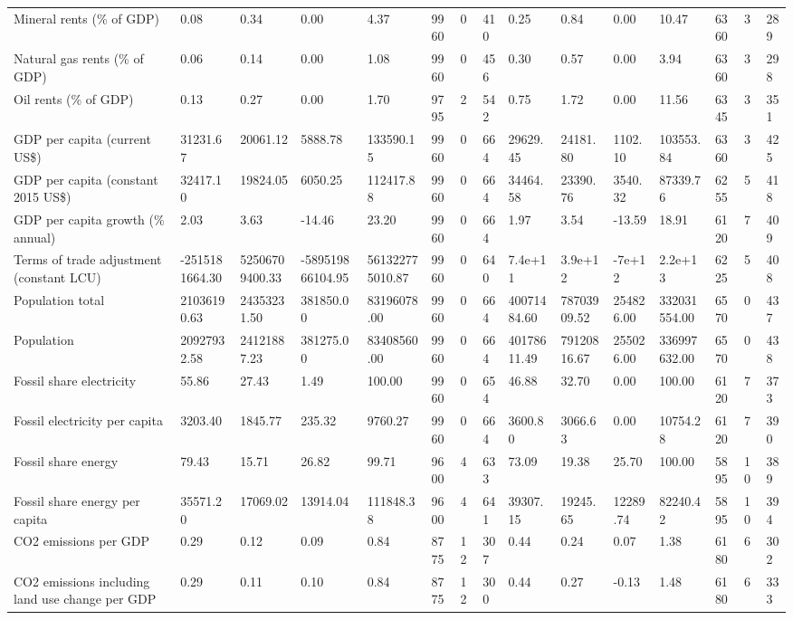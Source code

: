 \begin{longtable}{lllllllllllllll}
\addlinespace
Mineral rents (\% of GDP) & 0.08 & 0.34 & 0.00 & 4.37 & 9960 & 0 & 410 & 0.25 & 0.84 & 0.00 & 10.47 & 6360 & 3 & 289\\
Natural gas rents (\% of GDP) & 0.06 & 0.14 & 0.00 & 1.08 & 9960 & 0 & 456 & 0.30 & 0.57 & 0.00 & 3.94 & 6360 & 3 & 298\\
Oil rents (\% of GDP) & 0.13 & 0.27 & 0.00 & 1.70 & 9795 & 2 & 542 & 0.75 & 1.72 & 0.00 & 11.56 & 6345 & 3 & 351\\
GDP per capita (current US\$) & 31231.67 & 20061.12 & 5888.78 & 133590.15 & 9960 & 0 & 664 & 29629.45 & 24181.80 & 1102.10 & 103553.84 & 6360 & 3 & 425\\
GDP per capita (constant 2015 US\$) & 32417.10 & 19824.05 & 6050.25 & 112417.88 & 9960 & 0 & 664 & 34464.58 & 23390.76 & 3540.32 & 87339.76 & 6255 & 5 & 418\\
\addlinespace
GDP per capita growth (\% annual) & 2.03 & 3.63 & -14.46 & 23.20 & 9960 & 0 & 664 & 1.97 & 3.54 & -13.59 & 18.91 & 6120 & 7 & 409\\
Terms of trade adjustment (constant LCU) & -2515181664.30 & 52506709400.33 & -589519866104.95 & 561322775010.87 & 9960 & 0 & 640 & 7.4e+11 & 3.9e+12 & -7e+12 & 2.2e+13 & 6225 & 5 & 408\\
Population total & 21036190.63 & 24353231.50 & 381850.00 & 83196078.00 & 9960 & 0 & 664 & 40071484.60 & 78703909.52 & 254826.00 & 332031554.00 & 6570 & 0 & 437\\
Population & 20927932.58 & 24121887.23 & 381275.00 & 83408560.00 & 9960 & 0 & 664 & 40178611.49 & 79120816.67 & 255026.00 & 336997632.00 & 6570 & 0 & 438\\
Fossil share electricity & 55.86 & 27.43 & 1.49 & 100.00 & 9960 & 0 & 654 & 46.88 & 32.70 & 0.00 & 100.00 & 6120 & 7 & 373\\
\addlinespace
Fossil electricity per capita & 3203.40 & 1845.77 & 235.32 & 9760.27 & 9960 & 0 & 664 & 3600.80 & 3066.63 & 0.00 & 10754.28 & 6120 & 7 & 390\\
Fossil share energy & 79.43 & 15.71 & 26.82 & 99.71 & 9600 & 4 & 633 & 73.09 & 19.38 & 25.70 & 100.00 & 5895 & 10 & 389\\
Fossil share energy per capita & 35571.20 & 17069.02 & 13914.04 & 111848.38 & 9600 & 4 & 641 & 39307.15 & 19245.65 & 12289.74 & 82240.42 & 5895 & 10 & 394\\
CO2 emissions per GDP & 0.29 & 0.12 & 0.09 & 0.84 & 8775 & 12 & 307 & 0.44 & 0.24 & 0.07 & 1.38 & 6180 & 6 & 302\\
CO2 emissions including land use change per GDP & 0.29 & 0.11 & 0.10 & 0.84 & 8775 & 12 & 300 & 0.44 & 0.27 & -0.13 & 1.48 & 6180 & 6 & 333\\

\end{longtable}
